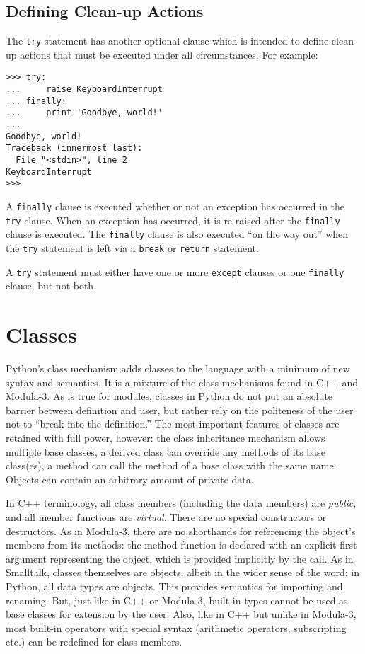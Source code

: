 \section{Defining Clean-up Actions}

The {\tt try} statement has another optional clause which is intended to
define clean-up actions that must be executed under all circumstances.
For example:

\bcode\begin{verbatim}
>>> try:
...     raise KeyboardInterrupt
... finally:
...     print 'Goodbye, world!'
... 
Goodbye, world!
Traceback (innermost last):
  File "<stdin>", line 2
KeyboardInterrupt
>>> 
\end{verbatim}\ecode
%
A {\tt finally} clause is executed whether or not an exception has
occurred in the {\tt try} clause.  When an exception has occurred, it
is re-raised after the {\tt finally} clause is executed.  The
{\tt finally} clause is also executed ``on the way out'' when the
{\tt try} statement is left via a {\tt break} or {\tt return}
statement.

A {\tt try} statement must either have one or more {\tt except}
clauses or one {\tt finally} clause, but not both.


\chapter{Classes}

Python's class mechanism adds classes to the language with a minimum
of new syntax and semantics.  It is a mixture of the class mechanisms
found in C++ and Modula-3.  As is true for modules, classes in Python
do not put an absolute barrier between definition and user, but rather
rely on the politeness of the user not to ``break into the
definition.''  The most important features of classes are retained
with full power, however: the class inheritance mechanism allows
multiple base classes, a derived class can override any methods of its
base class(es), a method can call the method of a base class with the
same name.  Objects can contain an arbitrary amount of private data.

In C++ terminology, all class members (including the data members) are
{\em public}, and all member functions are {\em virtual}.  There are
no special constructors or destructors.  As in Modula-3, there are no
shorthands for referencing the object's members from its methods: the
method function is declared with an explicit first argument
representing the object, which is provided implicitly by the call.  As
in Smalltalk, classes themselves are objects, albeit in the wider
sense of the word: in Python, all data types are objects.  This
provides semantics for importing and renaming.  But, just like in C++
or Modula-3, built-in types cannot be used as base classes for
extension by the user.  Also, like in C++ but unlike in Modula-3, most
built-in operators with special syntax (arithmetic operators,
subscripting etc.) can be redefined for class members.


